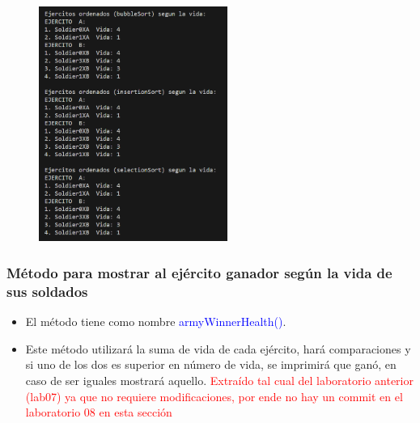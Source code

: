 \documentclass{article}
\begin{document}
        \begin{figure}[H]
            \centering
            \includegraphics[width=0.55\textwidth,keepaspectratio]{img/printArmyHealth.png}
            \caption{}
        \end{figure}
        
\newpage
        \subsubsection{Método para mostrar al ejército ganador según la vida de sus soldados}
        
        \begin{itemize}
            \item El método tiene como nombre \textcolor{blue}{armyWinnerHealth()}.
            \item Este método utilizará la suma de vida de cada ejército, hará comparaciones y si uno de los dos es superior en número de vida, se imprimirá que ganó, en caso de ser iguales mostrará aquello. \textcolor{red}{Extraído tal cual del laboratorio anterior (lab07) ya que no requiere modificaciones, por ende no hay un commit en el laboratorio 08 en esta sección}
        \end{itemize}
        
        
        
        
\end{document}
